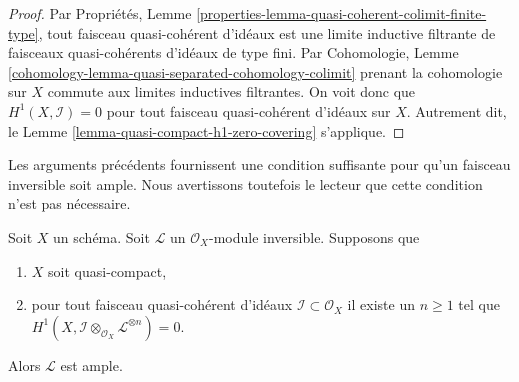 \begin{proof}
Par Propriétés, Lemme \ref{properties-lemma-quasi-coherent-colimit-finite-type},
tout faisceau quasi-cohérent d'idéaux est une limite inductive filtrante de
faisceaux quasi-cohérents d'idéaux de type fini. Par Cohomologie, Lemme
\ref{cohomology-lemma-quasi-separated-cohomology-colimit} prenant la
cohomologie sur $X$ commute aux limites inductives filtrantes. On voit donc que
$H^1(X, \mathcal{I}) = 0$ pour tout faisceau quasi-cohérent d'idéaux sur $X$.
Autrement dit, le Lemme
\ref{lemma-quasi-compact-h1-zero-covering} s'applique.
\end{proof}

\noindent
Les arguments précédents fournissent une condition suffisante pour qu'un
faisceau inversible soit ample. Nous avertissons toutefois le lecteur que cette
condition n'est pas nécessaire.

\begin{lemma}
\label{lemma-quasi-compact-h1-zero-invertible}
Soit $X$ un schéma. Soit $\mathcal{L}$ un $\mathcal{O}_X$-module inversible.
Supposons que
\begin{enumerate}
\item $X$ soit quasi-compact, \item pour tout faisceau quasi-cohérent d'idéaux
$\mathcal{I} \subset \mathcal{O}_X$ il existe un $n \geq 1$ tel que
$H^1(X, \mathcal{I} \otimes_{\mathcal{O}_X} \mathcal{L}^{\otimes n}) = 0$.
\end{enumerate}
Alors $\mathcal{L}$ est ample.
\end{lemma}

